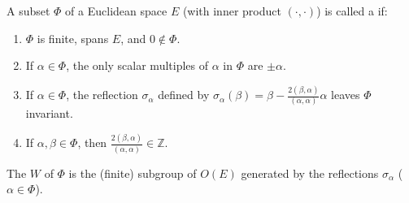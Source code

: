 A subset $\Phi$ of a Euclidean space $E$ (with inner product $(\cdot, \cdot)$) is called a  if:
\begin{enumerate}
\item[(R1)] $\Phi$ is finite, spans $E$, and $0 \notin \Phi$.
\item[(R2)] If $\alpha \in \Phi$, the only scalar multiples of $\alpha$ in $\Phi$ are $\pm \alpha$.
\item[(R3)] If $\alpha \in \Phi$, the reflection $\sigma_\alpha$ defined by $\sigma_\alpha(\beta) = \beta - \frac{2(\beta, \alpha)}{(\alpha, \alpha)}\alpha$ leaves $\Phi$ invariant.
\item[(R4)] If $\alpha, \beta \in \Phi$, then $\frac{2(\beta, \alpha)}{(\alpha, \alpha)} \in \mathbb{Z}$.
\end{enumerate}

The  $W$ of $\Phi$ is the (finite) subgroup of $O(E)$ generated by the reflections $\sigma_\alpha$ ($\alpha \in \Phi$).
